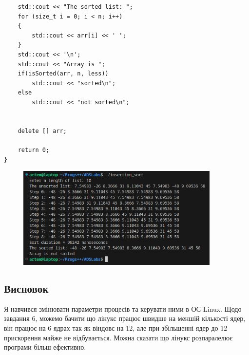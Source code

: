 \documentclass[12pt]{extarticle}
\begin{document}
{\begin{verbatim}
    std::cout << "The sorted list: ";
    for (size_t i = 0; i < n; i++)
    {
        std::cout << arr[i] << ' ';
    }
    std::cout << '\n';
    std::cout << "Array is ";
    if(isSorted(arr, n, less))
        std::cout << "sorted\n";
    else
        std::cout << "not sorted\n";


    delete [] arr;
    
    return 0;
}

\end{verbatim}
}
\vspace{12pt}
\begin{figure}[H]
    \centering
    \includegraphics[width=0.90\textwidth]{Screenshot_20231009_222549.png}
    \caption{}
\end{figure}
\subsection*{Висновок} Я навчився змінювати параметри процесів та керувати ними в ОС Linux. Щодо 
завдання 6, можемо бачити що лінукс працює швидше на меншій кількості ядер, він 
працює на 6 ядрах так як віндовс на 12, але при збільшенні ядер до 12 прискорення майже не відбувається.
Можна сказати що лінукс розпаралелює програми більш ефективно.
\end{document}
